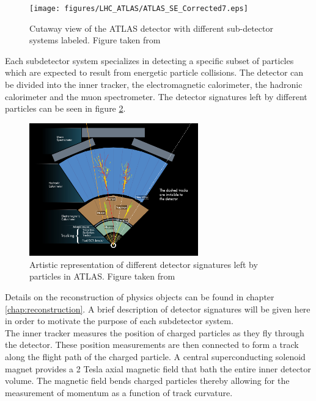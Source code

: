 \begin{figure}[h!]
\centering
\texttt{[image: figures/LHC\_ATLAS/ATLAS\_SE\_Corrected7.eps]}
\caption{ Cutaway view of the ATLAS detector with different sub-detector systems labeled. Figure taken from \cite{ATLAS_JINST} \label{LHC:fig:ATLASDet}}
\end{figure}

\indent Each subdetector system specializes in detecting a specific subset of particles which are expected to result from energetic particle collisions.  The detector can be divided into the inner tracker, the electromagnetic calorimeter, the hadronic calorimeter and the muon spectrometer.  The detector signatures left by different particles can be seen in figure \ref{LHC:fig:ATLASSig}. \\

\begin{figure}[h!]
\centering
\includegraphics[width=0.65\textwidth, angle=0]{figures/LHC_ATLAS/ATLAS_Signature.jpg}
\caption{ Artistic representation of different detector signatures left by particles in ATLAS. Figure taken from \cite{ATLASSig} \label{LHC:fig:ATLASSig}}
\end{figure}

\indent Details on the reconstruction of physics objects can be found in chapter \ref{chap:reconstruction}.  A brief description of detector signatures will be given here in order to motivate the purpose of each subdetector system. \\

\indent The inner tracker measures the position of charged particles as they fly through the detector.  These position measurements are then connected to form a track along the flight path of the charged particle.  A central superconducting solenoid magnet provides a 2 Tesla axial magnetic field that bath the entire inner detector volume.  The magnetic field bends charged particles thereby allowing for the measurement of momentum as a function of track curvature.  \\

